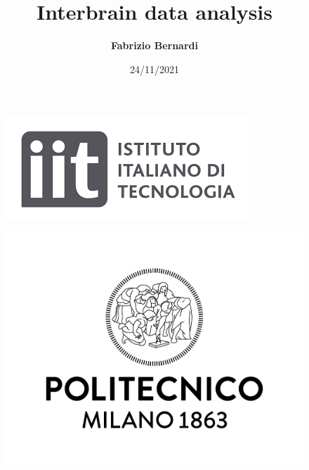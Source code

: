 \documentclass{beamer}
\title{Interbrain data analysis}
\author[F. Bernardi]{\textbf{Fabrizio Bernardi}} \medskip
\date[24/11/2021]{24/11/2021}
\begin{document}
		\begin{frame}
	\maketitle
	
	\begin{minipage}{\linewidth}
		\centering
		\begin{minipage}{0.45\linewidth}
			\begin{figure}[H]
				\includegraphics[width=\linewidth]{Logo_IIT.png}
				
			\end{figure}
		\end{minipage}
		\hspace{0.05\linewidth}
		\begin{minipage}{0.45\linewidth}
			\begin{figure}[H]
				\includegraphics[width=\linewidth]{Logo_Politecnico_Milano.jpg}
				
			\end{figure}
		\end{minipage}
	\end{minipage}
\end{frame}
\end{document}
